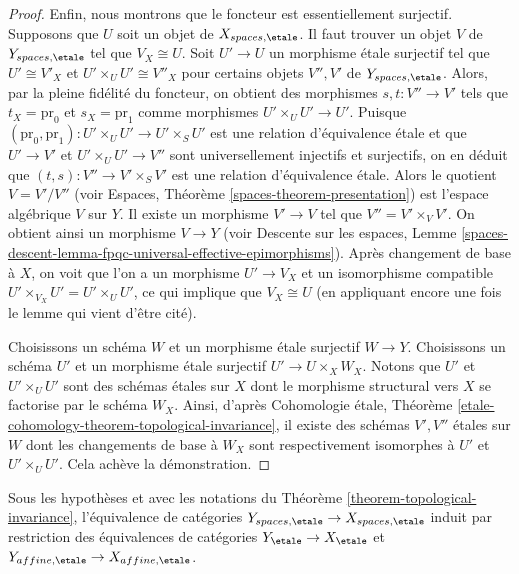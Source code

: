 \begin{proof}
\medskip\noindent
Enfin, nous montrons que le foncteur est essentiellement surjectif.
Supposons que $U$ soit un objet de $X_{spaces, \etale}$.
Il faut trouver un objet $V$ de $Y_{spaces, \etale}$
tel que $V_X \cong U$. Soit $U' \to U$ un morphisme étale surjectif
tel que $U' \cong V'_X$ et $U' \times_U U' \cong V''_X$
pour certains objets $V'', V'$ de $Y_{spaces, \etale}$.
Alors, par la pleine fidélité du foncteur, on obtient des morphismes
$s, t : V'' \to V'$ tels que $t_X = \text{pr}_0$ et $s_X = \text{pr}_1$
comme morphismes $U' \times_U U' \to U'$. Puisque
$(\text{pr}_0, \text{pr}_1) : U' \times_U U' \to U' \times_S U'$
est une relation d'équivalence étale et que $U' \to V'$ et
$U' \times_U U' \to V''$ sont universellement injectifs et surjectifs,
on en déduit que
$(t, s) : V'' \to V' \times_S V'$ est une relation d'équivalence étale.
Alors le quotient $V = V'/V''$ (voir
Espaces, Théorème \ref{spaces-theorem-presentation})
est l'espace algébrique $V$ sur $Y$. Il existe un morphisme
$V' \to V$ tel que $V'' = V' \times_V V'$. On obtient ainsi un morphisme
$V \to Y$ (voir
Descente sur les espaces, Lemme
\ref{spaces-descent-lemma-fpqc-universal-effective-epimorphisms}).
Après changement de base à $X$, on voit que l'on a un morphisme $U' \to V_X$
et un isomorphisme compatible $U' \times_{V_X} U' = U' \times_U U'$, ce qui
implique que $V_X \cong U$ (en appliquant encore une fois le lemme qui vient d'être cité).

\medskip\noindent
Choisissons un schéma $W$ et un morphisme étale surjectif $W \to Y$.
Choisissons un schéma $U'$ et un morphisme étale surjectif $U' \to U \times_X W_X$.
Notons que $U'$ et $U' \times_U U'$ sont des schémas étales sur $X$ dont le
morphisme structural vers $X$ se factorise par le schéma $W_X$.
Ainsi, d'après
Cohomologie étale,
Théorème \ref{etale-cohomology-theorem-topological-invariance},
il existe des schémas $V', V''$ étales sur $W$ dont les changements de base à
$W_X$ sont respectivement isomorphes à $U'$ et $U' \times_U U'$.
Cela achève la démonstration.
\end{proof}

\begin{lemma}
\label{lemma-topological-invariance}
Sous les hypothèses et avec les notations du
Théorème \ref{theorem-topological-invariance},
l'équivalence de catégories
$Y_{spaces, \etale} \to X_{spaces, \etale}$
induit par restriction des équivalences de catégories
$Y_\etale \to X_\etale$ et $Y_{affine, \etale} \to X_{affine, \etale}$.
\end{lemma}

